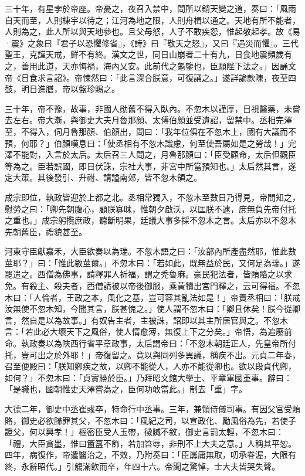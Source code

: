 \begin{pinyinscope}
 三十年，有星孛於帝座。帝憂之，夜召入禁中，問所以銷天變之道，奏曰：「風雨自天而至，人則棟宇以待之；江河為地之限，人則舟楫以通之。天地有所不能者，人則為之，此人所以與天地參也。且父母怒，人子不敢疾怨，惟起敬起孝。故《易·震》之象曰『君子以恐懼修省』，《詩》曰『敬天之怒』，又曰『遇災而懼』。三代聖王，克謹天戒，鮮不有終。漢文之世，同日山崩者二十有九，日食地震頻歲有之，善用此道，天亦悔禍，海內乂安。此前代之龜鑒也，臣願陛下法之。」因誦文帝《日食求言詔》。帝悚然曰：「此言深合朕意，可復誦之。」遂詳論款陳，夜至四鼓，明日進膳，帝以盤珍賜之。



 三十年，帝不豫，故事，非國人勛舊不得入臥內。不忽木以謹厚，日視醫藥，未嘗去左右。帝大漸，與御史大夫月魯那顏、太傅伯顏並受遺詔，留禁中。丞相完澤至，不得入，伺月魯那顏、伯顏出，問曰：「我年位俱在不忽木上，國有大議而不預，何耶？」伯顏嘆息曰：「使丞相有不忽木識慮，何至使吾屬如是之勞哉！」完澤不能對，入言於太后。太后召三人問之，月魯那顏曰：「臣受顧命，太后但觀臣等為之。臣若誤國，即日伏誅，宗社大事，非宮中所當預知也。」太后然其言，遂定大策。其後發引、升祔、請謚南郊，皆不忽木領之。



 成宗即位，執政皆迎於上都之北。丞相常獨入，不忽木至數日乃得見，帝問知之，慰勞之曰：「卿先朝腹心，顧朕寡昧，惟朝夕啟沃，以匡朕不逮，庶無負先帝付托之重也。」成宗躬攬庶政，聽斷明果，廷議大事多採不忽木之言。太后亦以不忽木先朝舊臣，禮貌甚至。



 河東守臣獻嘉禾，大臣欲奏以為瑞。不忽木語之曰：「汝部內所產盡然耶，惟此數莖耶？」曰：「惟此數莖爾。」不忽木曰：「若如此，既無益於民，又何足為瑞。」遂罷遣之。西僧為佛事，請釋罪人祈福，謂之禿魯麻。豪民犯法者，皆賄賂之以求免。有殺主、殺夫者，西僧請被以帝後御服，乘黃犢出宮門釋之，云可得福。不忽木曰：「人倫者，王政之本，風化之基，豈可容其亂法如是！」帝責丞相曰：「朕戒汝無使不忽木知，今聞其言，朕甚愧之。」使人謂不忽木曰：「卿且休矣！朕今從卿言，然自是以為故事。」有奴告主者，主被誅，詔即以其主所居官與之。不忽木言：「若此必大壞天下之風俗，使人情愈薄，無復上下之分矣。」帝悟，為追廢前命。執政奏以為陜西行省平章政事，太后謂帝曰：「不忽木朝廷正人，先皇帝所付托，豈可出之於外耶！」帝復留之。竟以與同列多異議，稱疾不出。元貞二年春，召至便殿曰：「朕知卿疾之故，以卿不能從人，人亦不能從卿也。欲以段貞代卿，如何？」不忽木曰：「貞實勝於臣。」乃拜昭文館大學士、平章軍國重事。辭曰：「是職也，國朝惟史天澤嘗為之，臣何功敢當此。」制去「重」字。



 大德二年，御史中丞崔彧卒，特命行中丞事。三年，兼領侍儀司事。有因父官受賄賂，御史必欲歸罪其父，不忽木曰：「風紀之司，以宣政化、勵風俗為先，若使子證父，何以興孝！」樞密臣受人玉帶，徵贓不敘，御史言罰太輕，不忽木曰：「禮，大臣貪墨，惟曰簠簋不飾，若加笞辱，非刑不上大夫之意。」人稱其平恕。四年，病復作，帝遣醫治之，不效，乃附奏曰：「臣孱庸無取，叨承眷渥，大限有終，永辭昭代。」引觴滿飲而卒，年四十六。帝聞之驚悼，士大夫皆哭失聲。




\end{pinyinscope}
